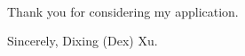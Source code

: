 \documentclass{friggeri-cv}
\begin{document}
  \paragraph{}
  Thank you for considering my application.

  \vspace{10mm}

  \noindent Sincerely,
  \newline Dixing (Dex) Xu.
\end{document}
